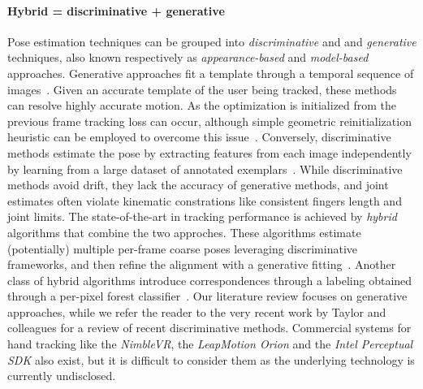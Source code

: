 \paragraph{Hybrid = discriminative + generative}
% 
Pose estimation techniques can be grouped into \emph{discriminative} and and \emph{generative} techniques, also known respectively as \emph{appearance-based} and \emph{model-based} approaches.
Generative approaches fit a template through a temporal sequence of images~\cite{oiko2011hand,melax2013dynamics,schroder2014real,tagliasacchi2015robust}. Given an accurate template of the user being tracked, these methods can resolve highly accurate motion. As the optimization is initialized from the previous frame tracking loss can occur, although simple geometric reinitialization heuristic can be employed to overcome this issue~\cite{melax2013dynamics,qian2014realtime}. 
Conversely, discriminative methods estimate the pose by extracting features from each image independently by learning from a large dataset of annotated exemplars~\cite{keskin2012hand,tang2013real,tejani2014latent,sun2015cascaded}.
While discriminative methods avoid drift, they lack the accuracy of generative methods, and joint estimates often violate kinematic constrations like consistent fingers length and joint limits.
The state-of-the-art in tracking performance is achieved by \emph{hybrid} algorithms that combine the two approches. These algorithms estimate (potentially) multiple per-frame coarse poses leveraging discriminative frameworks, and then refine the alignment with a generative fitting~\cite{tompson2014real,qian2014realtime,sharp2015accurate}.
Another class of hybrid algorithms introduce correspondences through a labeling obtained through a per-pixel forest  classifier~\cite{sridhar2015fast,fleishman2015icpik}.
% 
Our literature review focuses on generative approaches, while we refer the reader to the very recent work by Taylor and colleagues  for a review of recent discriminative methods. Commercial systems for hand tracking like the \emph{NimbleVR\textcopyright}, the \emph{LeapMotion Orion\textcopyright} and the \emph{Intel Perceptual SDK\textcopyright} also exist, but it is difficult to consider them as the underlying technology is currently undisclosed. 

